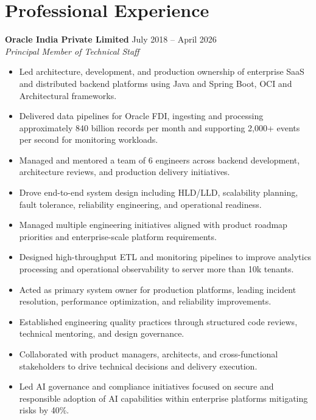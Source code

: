 \documentclass[11pt,a4paper]{article}
\begin{document}
\section*{Professional Experience}

\textbf{Oracle India Private Limited} \hfill July 2018 -- April 2026 \\
\textit{Principal Member of Technical Staff}

\begin{itemize}
    \item Led architecture, development, and production ownership of enterprise SaaS and distributed backend platforms using Java and Spring Boot, OCI and Architectural frameworks.

    \item Delivered data pipelines for Oracle FDI, ingesting and processing approximately 840 billion records per month and supporting 2,000+ events per second for monitoring workloads.
    
    \item Managed and mentored a team of 6 engineers across backend development, architecture reviews, and production delivery initiatives.
    
    \item Drove end-to-end system design including HLD/LLD, scalability planning, fault tolerance, reliability engineering, and operational readiness.
    
    \item Managed multiple engineering initiatives aligned with product roadmap priorities and enterprise-scale platform requirements.
    
    \item Designed high-throughput ETL and monitoring pipelines to improve analytics processing and operational observability to server more than 10k tenants.
    
    \item Acted as primary system owner for production platforms, leading incident resolution, performance optimization, and reliability improvements.
    
    \item Established engineering quality practices through structured code reviews, technical mentoring, and design governance.
    
    \item Collaborated with product managers, architects, and cross-functional stakeholders to drive technical decisions and delivery execution.
    
    \item Led AI governance and compliance initiatives focused on secure and responsible adoption of AI capabilities within enterprise platforms mitigating risks by 40\%.
\end{itemize}
\end{document}
